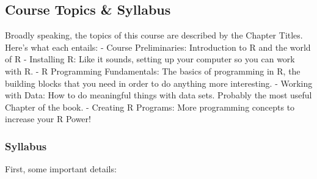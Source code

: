 \documentclass[
]{article}
\begin{document}
\hypertarget{course-topics-syllabus}{%
\subsection{Course Topics \& Syllabus}\label{course-topics-syllabus}}

Broadly speaking, the topics of this course are described by the Chapter Titles. Here's what each entails:
- Course Preliminaries: Introduction to R and the world of R
- Installing R: Like it sounds, setting up your computer so you can work with R.
- R Programming Fundamentals: The basics of programming in R, the building blocks that you need in order to do anything more interesting.
- Working with Data: How to do meaningful things with data sets. Probably the most useful Chapter of the book.
- Creating R Programs: More programming concepts to increase your R Power!

\hypertarget{syllabus}{%
\subsubsection{Syllabus}\label{syllabus}}

First, some important details:
\end{document}
